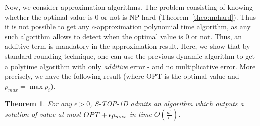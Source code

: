 \documentclass[a4paper]{book}
\newtheorem{theorem}{Theorem}[chapter]
\newcommand{\statoned}{{\sc S-TOP-1D }}
\begin{document}
Now, we consider approximation algorithms.
 The problem consisting of knowing whether the optimal value is 0 or not is {\sc NP}-hard (Theorem~\ref{theo:nphard}). Thus it is not possible to get any $c$-approximation polynomial time algorithm, as any such algorithm allows to detect when the optimal value is 0 or not. Thus, an additive term is mandatory in the approximation result. Here, we show that by standard rounding technique, one can use the previous dynamic algorithm to get a polytime algorithm with only {\it additive} error - and no multiplicative error. More precisely, we have the following result (where {\sc OPT} is the optimal value and $p_{max}=\max p_i$).

\begin{theorem}\label{th:approx1d}
For any $\epsilon>0$, \statoned admits an algorithm which outputs a solution of value at most ${\sc OPT}+\epsilon p_{max}$ in time $O(\frac{n^3}{\epsilon})$.
\end{theorem}
\end{document}
